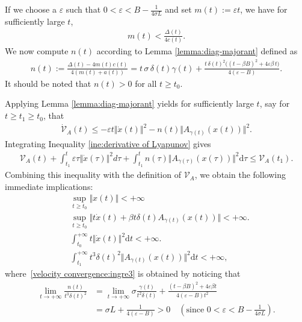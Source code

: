 \documentclass[11pt]{article}
\numberwithin{equation}{section}
\begin{document}
If we choose a $\varepsilon$ such that $0<\varepsilon<B-\frac{1}{4\sigma L}$ and set $m(t):=\varepsilon t$, we have for sufficiently large $t$,
\begin{align*}
    m(t)<\frac{\Delta(t)}{4c(t)}.
\end{align*}
We now compute $n(t)$ according to Lemma \ref{lemma:diag-majorant} defined as 
\begin{align*}
    n(t):= \frac{\Delta(t)-4m(t)c(t)}{4(m(t)+a(t))} 
    =t\,\sigma\,\delta(t)\gamma(t)
+\frac{t\,\delta(t)^{2}\Big((t-\beta B)^{2}+4\varepsilon\beta\,t\Big)}{4(\varepsilon-B)}.
\end{align*}
It should be noted that $n(t) > 0$ for all $t \geq t_0$. 

Applying Lemma \ref{lemma:diag-majorant} yields for sufficiently large $t$, say for $t \geq t_1\geq t_0$, that
\begin{align}
    \label{ine:derivative of Lyapunov}\dot{\mathcal{V}}_{A}(t) \le -\varepsilon t\Vert \dot{x}(t)\Vert^2 -n(t)\Big\Vert A_{\gamma(t)}(x(t)) \Big \Vert^2.
\end{align}
Integrating Inequality \eqref{ine:derivative of Lyapunov} gives 
\begin{align*}
    \mathcal{V}_{A}(t)+\int_{t_1}^{t} \varepsilon \tau\Vert \dot{x}(\tau) \Vert^2 d\tau +\int_{t_1}^{t} n(\tau)\Big\Vert A_{\gamma(\tau)}(x(\tau)) \Big \Vert^2 \mathrm{d}\tau \le \mathcal{V}_{A}(t_1).
\end{align*}
Combining this inequality with the definition of $\mathcal{V}_{A}$, we obtain the following immediate implications: 
\begin{align}
&\sup_{t\geq t_0}\Vert x(t) \Vert < +\infty \\
&\sup_{t\geq t_0}\Big\Vert t\dot{x}(t)+\beta t\delta(t)A_{\gamma(t)}(x(t)) \Big\Vert <+\infty. \label{property: sum of velo and A}\\
&\int_{t_0}^{+\infty} t\Vert \dot{x}(t) \Vert^2 \mathrm{d}t < +\infty. \label{velocity convergence:ingre1} \\
&\int_{t_1}^{+\infty} t^3\delta(t)^2\Big\Vert A_{\gamma(t)}(x(t)) \Big \Vert^2 \mathrm{d}t <+\infty, \label{velocity convergence:ingre3}
\end{align}
where~\eqref{velocity convergence:ingre3} is obtained by noticing that 
\begin{align*}
    \lim_{t \to +\infty} \frac{n(t)}{t^3\delta(t)^2}&=\lim_{t \to +\infty} \sigma \frac{\gamma(t)}{t^2\delta(t)}+\frac{(t-\beta B)^2+4\varepsilon \beta t}{4(\varepsilon-B)t^2} \\
    &=\sigma L+\frac{1}{4(\varepsilon-B)} >0 \quad (\text{since } 0<\varepsilon<B-\frac{1}{4\sigma L}).
\end{align*}
\end{document}
